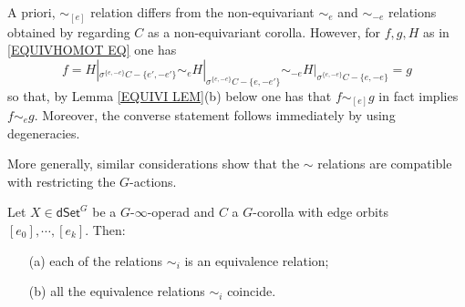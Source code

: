 \documentclass[a4paper,10pt
,draft
]{article}%
\renewcommand{\1}{\eta}%
\begin{document}
\begin{example}
A priori, $\sim_{[e]}$ relation differs from the 
non-equivariant 
$\sim_{e}$ and $\sim_{-e}$
relations obtained by regarding $C$ as a non-equivariant corolla.
However, for $f,g,H$ as in \eqref{EQUIVHOMOT EQ} one has
\begin{equation}\label{EQUIVSIM EQ}
f = H|_{\sigma^{\{e,-e\}}C - \{e',-e'\}}
\sim_e H|_{\sigma^{\{e,-e\}}C - \{e,-e'\}}
\sim_{-e} H|_{\sigma^{\{e,-e\}}C - \{e,-e\}} =g
\end{equation}
so that, by Lemma \ref{EQUIVI LEM}(b) below one has that
$f \sim_{[e]} g$ in fact implies
$f \sim_{e} g$. Moreover, the converse statement follows immediately by using degeneracies.

More generally, similar considerations show that the $\sim$ relations are compatible with restricting the $G$-actions.
\end{example}


\begin{lemma}\label{EQUIVI LEM}
	Let $X \in \mathsf{dSet}^G$ be a $G$-$\infty$-operad and $C$ a $G$-corolla with edge orbits
	$[e_0],\cdots,[e_k]$. Then:
\begin{itemize}
	\item[(a)] each of the relations $\sim_i$ is an equivalence relation;
	\item[(b)] all the equivalence relations $\sim_i$ coincide.
\end{itemize}
\end{lemma}
\end{document}
